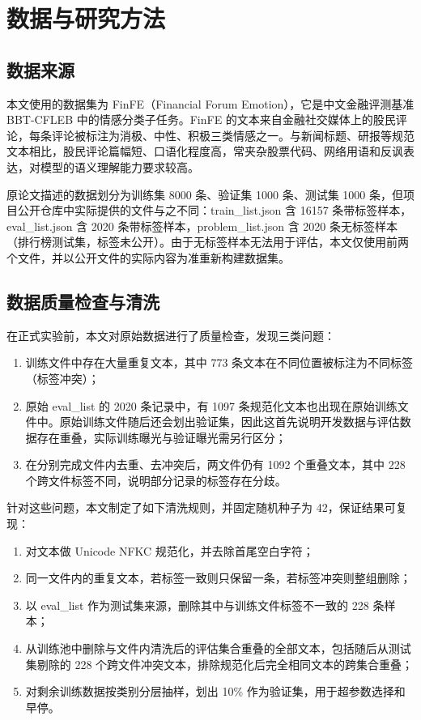 \clearpage\section{数据与研究方法}

\FloatBarrier\subsection{数据来源}

本文使用的数据集为 FinFE（Financial Forum Emotion），它是中文金融评测基准 BBT-CFLEB 中的情感分类子任务\cite{ref19}。FinFE 的文本来自金融社交媒体上的股民评论，每条评论被标注为消极、中性、积极三类情感之一。与新闻标题、研报等规范文本相比，股民评论篇幅短、口语化程度高，常夹杂股票代码、网络用语和反讽表达，对模型的语义理解能力要求较高。

原论文描述的数据划分为训练集 8000 条、验证集 1000 条、测试集 1000 条，但项目公开仓库中实际提供的文件与之不同：train\_list.json 含 16157 条带标签样本，eval\_list.json 含 2020 条带标签样本，problem\_list.json 含 2020 条无标签样本（排行榜测试集，标签未公开）。由于无标签样本无法用于评估，本文仅使用前两个文件，并以公开文件的实际内容为准重新构建数据集。

\FloatBarrier\subsection{数据质量检查与清洗}

在正式实验前，本文对原始数据进行了质量检查，发现三类问题：

\begin{enumerate}
\def\labelenumi{\arabic{enumi}.}
\tightlist
\item
  训练文件中存在大量重复文本，其中 773 条文本在不同位置被标注为不同标签（标签冲突）；
\item
  原始 eval\_list 的 2020 条记录中，有 1097 条规范化文本也出现在原始训练文件中。原始训练文件随后还会划出验证集，因此这首先说明开发数据与评估数据存在重叠，实际训练曝光与验证曝光需另行区分；
\item
  在分别完成文件内去重、去冲突后，两文件仍有 1092 个重叠文本，其中 228 个跨文件标签不同，说明部分记录的标签存在分歧。
\end{enumerate}

针对这些问题，本文制定了如下清洗规则，并固定随机种子为 42，保证结果可复现：

\begin{enumerate}
\def\labelenumi{\arabic{enumi}.}
\tightlist
\item
  对文本做 Unicode NFKC 规范化，并去除首尾空白字符；
\item
  同一文件内的重复文本，若标签一致则只保留一条，若标签冲突则整组删除；
\item
  以 eval\_list 作为测试集来源，删除其中与训练文件标签不一致的 228 条样本；
\item
  从训练池中删除与文件内清洗后的评估集合重叠的全部文本，包括随后从测试集剔除的 228 个跨文件冲突文本，排除规范化后完全相同文本的跨集合重叠；
\item
  对剩余训练数据按类别分层抽样，划出 10\% 作为验证集，用于超参数选择和早停。
\end{enumerate}

